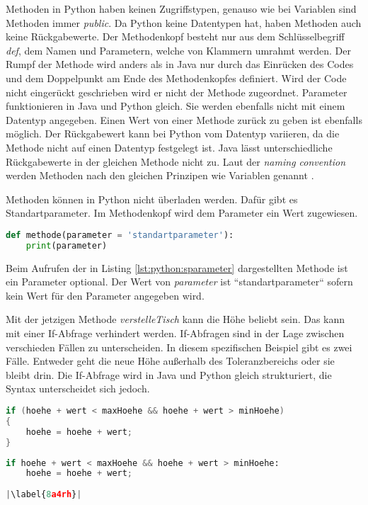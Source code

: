Methoden in Python haben keinen Zugriffstypen, genauso wie bei Variablen sind Methoden immer \textit{public}. Da Python keine Datentypen hat, haben Methoden auch keine Rückgabewerte. Der Methodenkopf besteht nur aus dem Schlüsselbegriff \textit{def}, dem Namen und Parametern, welche von Klammern umrahmt werden. Der Rumpf der Methode wird anders als in Java nur durch das Einrücken des Codes und dem Doppelpunkt am Ende des Methodenkopfes definiert. Wird der Code nicht eingerückt geschrieben wird er nicht der Methode zugeordnet. Parameter funktionieren in Java und Python gleich. Sie werden ebenfalls nicht mit einem Datentyp angegeben. Einen Wert von einer Methode zurück zu geben ist ebenfalls möglich. Der Rückgabewert kann bei Python vom Datentyp variieren, da die Methode nicht auf einen Datentyp festgelegt ist. Java lässt unterschiedliche Rückgabewerte in der gleichen Methode nicht zu. Laut der \textit{naming convention} werden Methoden nach den gleichen Prinzipen wie Variablen genannt \cite{Ims:h-s}\cite{Microsoft:CapCon}. \cite{Python3:Buch}\cite{Louis:2010}\par
Methoden können in Python nicht überladen werden. Dafür gibt es Standartparameter. Im Methodenkopf wird dem Parameter ein Wert zugewiesen.

\begin{lstlisting}[language=python,caption={Methode in Python mit Standartparameter},captionpos=b,label={lst:python:sparameter},frame=none]
def methode(parameter = 'standartparameter'):
    print(parameter)
\end{lstlisting}

Beim Aufrufen der in Listing \ref{lst:python:sparameter} dargestellten Methode ist ein Parameter optional. Der Wert von \textit{parameter} ist “standartparameter“ sofern kein Wert für den Parameter angegeben wird.\par
Mit der jetzigen Methode \textit{verstelleTisch} kann die Höhe beliebt sein. Das kann mit einer If-Abfrage verhindert werden. If-Abfragen sind in der Lage zwischen verschieden Fällen zu unterscheiden. In diesem spezifischen Beispiel gibt es zwei Fälle. Entweder geht die neue Höhe außerhalb des Toleranzbereichs oder sie bleibt drin. Die If-Abfrage wird in Java und Python gleich strukturiert, die Syntax unterscheidet sich jedoch. \cite{Python3:Buch}\cite{Louis:2010}

\begin{minipage}{.5\linewidth}
\begin{lstlisting}[language=java,caption={If-Abfrage in Java},captionpos=b,label={lst:java:if},frame=none]
if (hoehe + wert < maxHoehe && hoehe + wert > minHoehe)
{
    hoehe = hoehe + wert;
}
\end{lstlisting}
\end{minipage}
\begin{minipage}{.5\linewidth}
\begin{lstlisting}[language=python,caption={If-Abfrage in Python},captionpos=b,label={lst:python:if},frame=l,escapechar=|]
if hoehe + wert < maxHoehe && hoehe + wert > minHoehe:
    hoehe = hoehe + wert;
    
|\label{8a4rh}|
\end{lstlisting}
\end{minipage}

